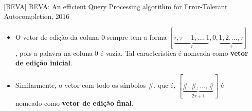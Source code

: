 \documentclass[11pt]{beamer}
\begin{document}
\begin{frame}{[BEVA] BEVA: An efficient Query Processing algorithm for Error-Tolerant Autocompletion, 2016}

    \small
    \begin{itemize}
        \item O vetor de edição da coluna 0 sempre tem a forma $[\underbrace{\tau, \tau - 1, \ldots, 1}_{\tau}, 0, \underbrace
{1, 2, \ldots, \tau}_{\tau}]$, pois a palavra na coluna 0 é vazia. Tal característica é nomeada como \textbf{vetor de edição inicial}.
        \item Similarmente, o vetor com todo os símbolos $\#$, que é, $[\underbrace{\#, \#, \ldots, \#}_{2\tau + 1}]$ é nomeado como \textbf{vetor de edição final}.
    \end{itemize}


\end{frame}
\end{document}
